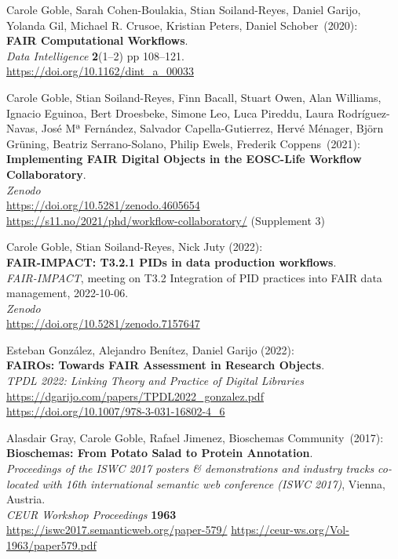 \begin{thebibliography}{9}
Carole Goble, Sarah Cohen-Boulakia, Stian Soiland-Reyes, Daniel
Garijo, Yolanda Gil, Michael R. Crusoe, Kristian Peters, Daniel Schober~(2020):\\
\textbf{FAIR Computational Workflows}.\\
\emph{Data Intelligence} \textbf{2}(1--2) pp 108--121.\\
\url{https://doi.org/10.1162/dint_a_00033}

Carole Goble, Stian Soiland-Reyes, Finn Bacall, Stuart
Owen, Alan Williams, Ignacio Eguinoa, Bert Droesbeke, Simone Leo, Luca
Pireddu, Laura Rodríguez-Navas, José Mª Fernández, Salvador
Capella-Gutierrez, Hervé Ménager, Björn Grüning, Beatriz Serrano-Solano,
Philip Ewels, Frederik Coppens~(2021):\\
\textbf{Implementing FAIR Digital Objects in the EOSC-Life Workflow
Collaboratory}.\\
\emph{Zenodo}\\
\url{https://doi.org/10.5281/zenodo.4605654}\\
\url{https://s11.no/2021/phd/workflow-collaboratory/} (Supplement 3)

Carole Goble, Stian Soiland-Reyes, Nick Juty (2022):\\
\textbf{FAIR-IMPACT: T3.2.1 PIDs in data production workflows}.\\
\emph{FAIR-IMPACT}, meeting on T3.2 Integration of PID practices into FAIR data management, 2022-10-06.\\
\emph{Zenodo}\\
\url{https://doi.org/10.5281/zenodo.7157647}

Esteban González, Alejandro Benítez, Daniel Garijo (2022):\\
\textbf{FAIROs: Towards FAIR Assessment in Research Objects}.\\
\emph{TPDL 2022: Linking Theory and Practice of Digital Libraries}\\
\url{https://dgarijo.com/papers/TPDL2022_gonzalez.pdf}\\
\url{https://doi.org/10.1007/978-3-031-16802-4_6}

Alasdair Gray, Carole Goble, Rafael Jimenez, Bioschemas
Community~(2017):\\
\textbf{Bioschemas: From Potato Salad to Protein Annotation}.\\
\emph{Proceedings of the ISWC 2017 posters \& demonstrations and
industry tracks co-located with 16th international semantic web
conference (ISWC 2017)}, Vienna, Austria.\\
\emph{CEUR Workshop Proceedings} \textbf{1963} \\
\url{https://iswc2017.semanticweb.org/paper-579/}
\url{https://ceur-ws.org/Vol-1963/paper579.pdf}


\end{thebibliography}
